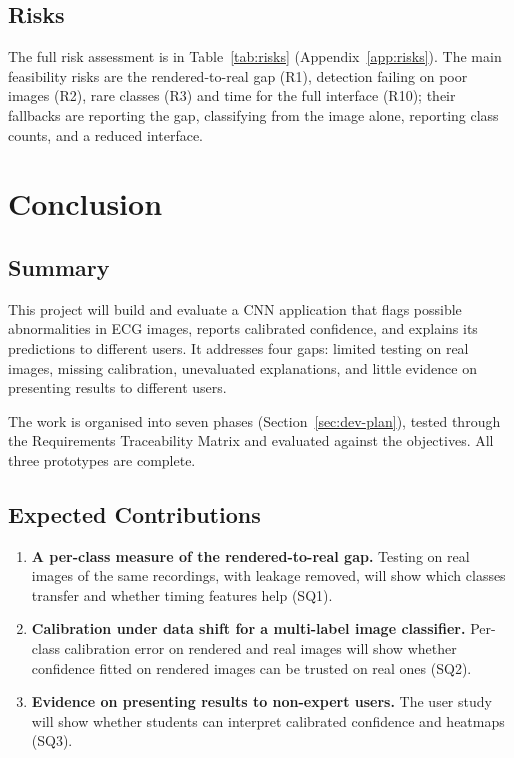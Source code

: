 \documentclass[12pt,nonacm,acmlarge,titlepage,screen]{acmart}
\begin{document}
\subsection{Risks}
\label{sec:feas-risks}

The full risk assessment is in Table~\ref{tab:risks} (Appendix~\ref{app:risks}). The main feasibility risks are the rendered-to-real gap (R1), detection failing on poor images (R2), rare classes (R3) and time for the full interface (R10); their fallbacks are reporting the gap, classifying from the image alone, reporting class counts, and a reduced interface.

\section{Conclusion}
\label{ch:conc}

\subsection{Summary}
\label{sec:conc-summary}

This project will build and evaluate a CNN application that flags possible abnormalities in ECG images, reports calibrated confidence, and explains its predictions to different users. It addresses four gaps: limited testing on real images, missing calibration, unevaluated explanations, and little evidence on presenting results to different users.

The work is organised into seven phases (Section~\ref{sec:dev-plan}), tested through the Requirements Traceability Matrix and evaluated against the objectives. All three prototypes are complete.

\subsection{Expected Contributions}
\label{sec:contributions}

\begin{enumerate}\setlength{\itemsep}{0pt}\setlength{\parskip}{0pt}
  \item \textbf{A per-class measure of the rendered-to-real gap.} Testing on real images of the same recordings, with leakage removed, will show which classes transfer and whether timing features help (SQ1).
  \item \textbf{Calibration under data shift for a multi-label image classifier.} Per-class calibration error on rendered and real images will show whether confidence fitted on rendered images can be trusted on real ones (SQ2).
  \item \textbf{Evidence on presenting results to non-expert users.} The user study will show whether students can interpret calibrated confidence and heatmaps (SQ3).
\end{enumerate}
\end{document}
